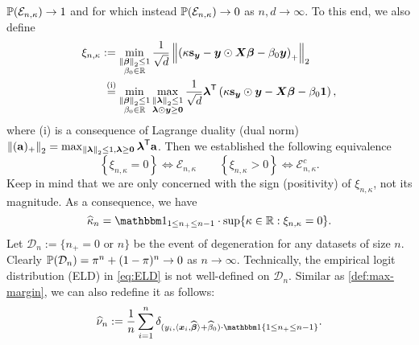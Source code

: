 $\P(\mathcal{E}_{n, \kappa}) \to 1$ and for which instead $\P(\mathcal{E}_{n, \kappa}) \to 0$ as $n,d \to \infty$. To this end, we also define
\begin{equation}
    \label{eq:xi_n_kappa}
    \begin{aligned}
        \xi_{n, \kappa} & := \min_{ \substack{ \norm{\vbeta}_2 \le 1 \\ \beta_0 \in \R} } \frac{1}{\sqrt{d}} \norm{ \left( \kappa \bs_\yy - \yy \odot \XX \vbeta  - \beta_0 \yy \right)_+ }_2 \\
        & \phantom{:}\overset{\mathmakebox[0pt][c]{\text{(i)}}}{=} \min_{ \substack{ \norm{\vbeta}_2 \le 1 \\ \beta_0 \in \R} } \max_{ \substack{ \norm{\blambda}_2 \le 1 \\ \blambda \odot \yy \ge \bzero} } \frac{1}{\sqrt{d}} \blambda^\top \left( \kappa \bs_\yy \odot \yy - \XX \vbeta  - \beta_0 \bone \right),
    \end{aligned}
\end{equation}
where (i) is a consequence of Lagrange duality (dual norm) $\norm{(\ba)_+}_2 = \max_{\norm{\blambda}_2 \le 1, \blambda \ge \bzero} \blambda^\top \ba$. Then we established the following equivalence
\begin{equation*}
    \left\{ \xi_{n, \kappa} = 0 \right\} \Longleftrightarrow \mathcal{E}_{n ,\kappa}
    \qquad
    \left\{ \xi_{n, \kappa} > 0 \right\} \Longleftrightarrow \mathcal{E}^c_{n ,\kappa}.
\end{equation*}
Keep in mind that we are only concerned with the sign (positivity) of $\xi_{n, \kappa}$, not its magnitude. As a consequence, we have
\begin{equation*}
    \hat\kappa_n = \ind_{1 \le n_+ \le n - 1}\cdot \sup\{ \kappa \in \R:  \xi_{n,\kappa} = 0 \}.
\end{equation*}
Let $\mathcal{D}_n := \{ n_+ = 0 \text{ or } n \}$ be the event of degeneration for any datasets of size $n$. Clearly $\P(\mathcal{D}_n) = \pi^n + (1 - \pi)^n \to 0$ as $n \to \infty$. Technically, the empirical logit distribution (ELD) in \cref{eq:ELD} is not well-defined on $\mathcal{D}_n$. Similar as \cref{def:max-margin}, we can also redefine it as follows:
\begin{equation}\label{eq:over_ELD_well}
    \hat \nu_{n} := \frac1n \sum_{i=1}^n \delta_{(y_i, \< \xx_i, \hat\vbeta \> + \hat\beta_{0} ) \cdot \ind\{1 \le n_+ \le n - 1\} }.
\end{equation}



